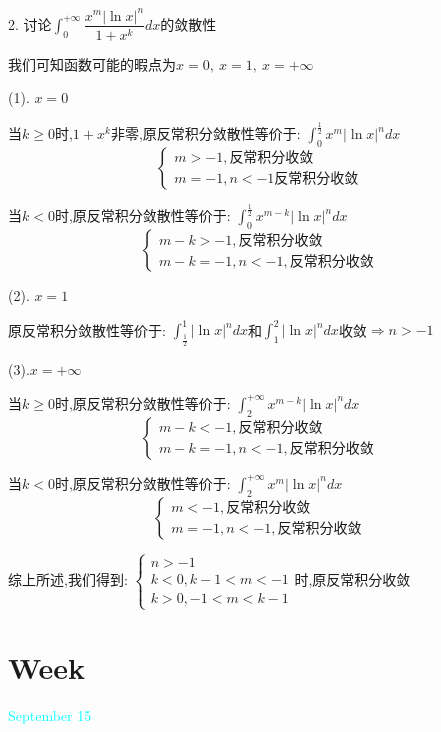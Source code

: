 2. 讨论$\int_{0}^{+\infty}\dfrac{x^m|\ln x|^n}{1+x^k}dx$的敛散性
\begin{solution}

	我们可知函数可能的暇点为$x=0,\ x=1,\ x=+\infty$
	
	(1). $x=0$
	
	当$k\geq 0$时,$1+x^{k}$非零,原反常积分敛散性等价于:  $\int_{0}^{\frac{1}{2}}x^{m}|\ln x|^ndx$
	$$\left\lbrace
	\begin{array}{l}
		m>-1,\text{反常积分收敛}\\
		m=-1,n<-1\text{反常积分收敛}
	\end{array}
	\right. $$
	
	当$k<0$时,原反常积分敛散性等价于:  $\int_{0}^{\frac{1}{2}}x^{m-k}|\ln x|^ndx$
	$$\left\lbrace
	\begin{array}{l}
		m-k>-1,\text{反常积分收敛}\\
		m-k=-1,n<-1,\text{反常积分收敛}
	\end{array}
	\right. $$
	
	(2). $x=1$
	
	原反常积分敛散性等价于:  $\int_{\frac{1}{2}}^{1}|\ln x|^ndx$和$\int_{1}^{2}|\ln x|^ndx$收敛$\Rightarrow n>-1$
	
	(3).$x=+\infty$
	
	当$k\geq 0$时,原反常积分敛散性等价于:  $\int_{2}^{+\infty}x^{m-k}|\ln x|^ndx$
	$$\left\lbrace
	\begin{array}{l}
		m-k<-1,\text{反常积分收敛}\\
		m-k=-1,n<-1,\text{反常积分收敛}
	\end{array}
	\right. $$
	
	当$k<0$时,原反常积分敛散性等价于:  $\int_{2}^{+\infty}x^{m}|\ln x|^ndx$
	$$\left\lbrace
	\begin{array}{l}
		m<-1,\text{反常积分收敛}\\
		m=-1,n<-1,\text{反常积分收敛}
	\end{array}
	\right. $$
	
	综上所述,我们得到:  $\left\lbrace
	\begin{array}{l}
		n>-1\\
		k<0,k-1<m<-1\\
		k>0,-1<m<k-1
	\end{array}
	\right. $时,原反常积分收敛
\end{solution}

\section{Week }
\textcolor{cyan}{September 15}

